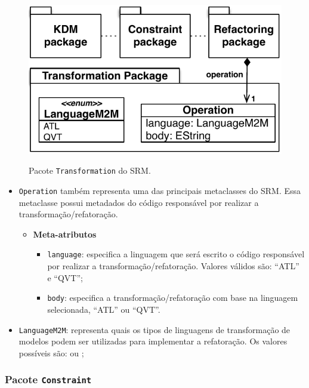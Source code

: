 \begin{figure}[h]
	\centering
		\caption{Pacote \texttt{Transformation} do SRM.}
	\includegraphics[scale=0.70]{images/TransformationPackageSRM3}
	\label{fig:pacote_transformation_srm}
	\fautor
\end{figure}

\begin{itemize}
    \item \texttt{Operation} também representa uma das principais metaclasses do SRM. Essa metaclasse possui metadados do código responsável por realizar a transformação/refatoração.

\begin{itemize}
	\item \textbf{Meta-atributos}
		\begin{itemize}
			\item \texttt{language}: especifica a linguagem que será escrito o código responsável por realizar a transformação/refatoração. Valores válidos são: ``ATL'' e ``QVT'';
			\item \texttt{body}: especifica a transformação/refatoração com base na linguagem selecionada, ``ATL'' ou ``QVT''.
		\end{itemize}	
\end{itemize}
     
     \item \texttt{LanguageM2M}: representa quais os tipos de linguagens de transformação de modelos podem ser utilizadas para implementar a refatoração. Os valores possíveis são:  ou ;
     
\end{itemize}

\subsubsection{Pacote \texttt{Constraint}}

